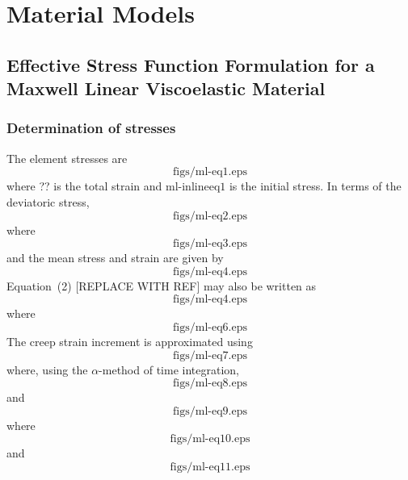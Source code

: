 \chapter{Material Models}

\section{Effective Stress Function Formulation for a Maxwell Linear
Viscoelastic Material}

\subsection{Determination of stresses}

The element stresses are
\begin{equation}
  \text{figs/ml-eq1.eps}
\end{equation}
where ?? is the total strain and $\text{ml-inlineeq1}$ is the initial
stress. In terms of the deviatoric stress,
\begin{equation}
  \text{figs/ml-eq2.eps}
\end{equation}
where
\begin{equation}
  \text{figs/ml-eq3.eps}
\end{equation}
and the mean stress and strain are given by
\begin{equation}
  \text{figs/ml-eq4.eps}
\end{equation}
Equation~(2) [REPLACE WITH REF] may also be written as
\begin{equation}
  \text{figs/ml-eq4.eps}
\end{equation}
where
\begin{equation}
  \text{figs/ml-eq6.eps}
\end{equation}
The creep strain increment is approximated using
\begin{equation}
  \text{figs/ml-eq7.eps}
\end{equation}
where, using the $\alpha$-method of time integration,
\begin{equation}
  \text{figs/ml-eq8.eps}
\end{equation}
and
\begin{equation}
  \text{figs/ml-eq9.eps}
\end{equation}
where
\begin{equation}
  \text{figs/ml-eq10.eps}
\end{equation}
and
\begin{equation}
  \text{figs/ml-eq11.eps}
\end{equation}
